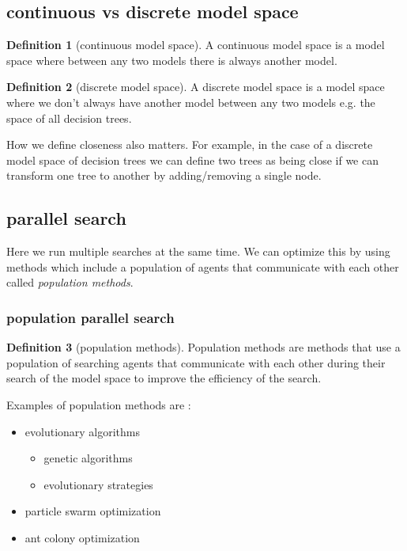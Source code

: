 \documentclass[12pt]{article}
\theoremstyle{definition}
\newtheorem{definition}{Definition}[section]
\begin{document}
\subsection{continuous vs discrete model space}

\begin{definition}[continuous model space]
    A continuous model space is a model space where between any two models there is always another model. 
\end{definition}

\begin{definition}[discrete model space]
    A discrete model space is a model space where we don't always have another model between any two models e.g. the space of all decision trees.
\end{definition}

How we define closeness also matters. For example, in the case of a discrete model space of decision trees we can define two trees as being close if we can transform one tree to another by adding/removing a single node.

\subsection{parallel search}

Here we run multiple searches at the same time. We can optimize this by using methods which include a population of agents that communicate with each other called \textit{population methods}.

\subsubsection*{population parallel search}

\begin{definition}[population methods]
    Population methods are methods that use a population of searching agents that communicate with each other during their search of the model space to improve the efficiency of the search.
\end{definition}

Examples of population methods are :
\begin{itemize}[leftmargin=*, noitemsep]
    \item evolutionary algorithms
    \begin{itemize}[leftmargin=*, noitemsep]
        \item genetic algorithms
        \item evolutionary strategies
    \end{itemize}
    \item particle swarm optimization
    \item ant colony optimization
\end{itemize}
\end{document}
